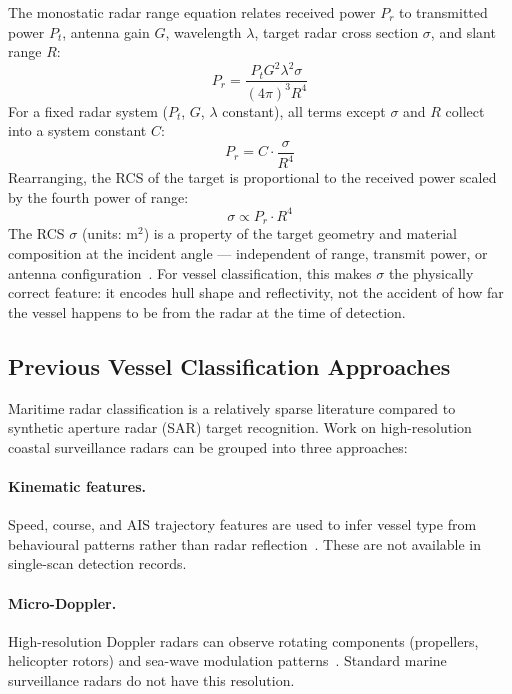 \documentclass[journal]{IEEEtran}
\begin{document}
The monostatic radar range equation relates received power $P_r$ to
transmitted power $P_t$, antenna gain $G$, wavelength $\lambda$,
target radar cross section $\sigma$, and slant range $R$:
\begin{equation}
  P_r = \frac{P_t G^2 \lambda^2 \sigma}{(4\pi)^3 R^4}
  \label{eq:rre}
\end{equation}
For a fixed radar system ($P_t$, $G$, $\lambda$ constant), all terms
except $\sigma$ and $R$ collect into a system constant $C$:
\begin{equation}
  P_r = C \cdot \frac{\sigma}{R^4}
  \label{eq:rre_simplified}
\end{equation}
Rearranging, the RCS of the target is proportional to the received
power scaled by the fourth power of range:
\begin{equation}
  \sigma \propto P_r \cdot R^4
  \label{eq:rcs_def}
\end{equation}
The RCS $\sigma$ (units: m$^2$) is a property of the target geometry
and material composition at the incident angle — independent of range,
transmit power, or antenna configuration~\cite{skolnik2001,knott1993rcs}.
For vessel classification, this makes $\sigma$ the physically correct
feature: it encodes hull shape and reflectivity, not the accident of
how far the vessel happens to be from the radar at the time of
detection.

\subsection{Previous Vessel Classification Approaches}

Maritime radar classification is a relatively sparse literature
compared to synthetic aperture radar (SAR) target recognition.
Work on high-resolution coastal surveillance radars can be grouped into
three approaches:

\paragraph{Kinematic features.} Speed, course, and AIS trajectory
features are used to infer vessel type from behavioural patterns rather
than radar reflection~\cite{dcouto2011maritime,nguyen2019vessel}. These are
not available in single-scan detection records.

\paragraph{Micro-Doppler.} High-resolution Doppler radars can observe
rotating components (propellers, helicopter rotors) and sea-wave
modulation patterns~\cite{chen2006microdoppler}. Standard marine surveillance
radars do not have this resolution.
\end{document}
